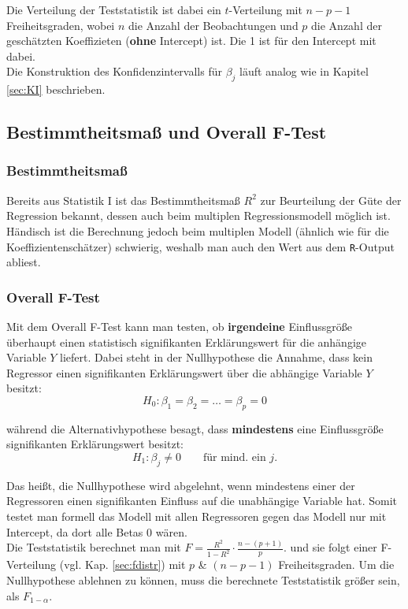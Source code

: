 \documentclass[a4paper]{article}
\begin{document}
\noindent Die Verteilung der Teststatistik ist dabei ein $t$-Verteilung mit $n-p-1$ Freiheitsgraden, wobei $n$ die Anzahl der Beobachtungen und $p$ die Anzahl der geschätzten Koeffizieten (\textbf{ohne} Intercept) ist. Die 1 ist für den Intercept mit dabei.\\

\noindent Die Konstruktion des Konfidenzintervalls für $\beta_j$ läuft analog wie in Kapitel \ref{sec:KI} beschrieben.

\subsection{Bestimmtheitsmaß und Overall F-Test}
\subsubsection{Bestimmtheitsmaß}
Bereits aus Statistik I ist das Bestimmtheitsmaß $R^2$ zur Beurteilung der Güte der Regression bekannt, dessen auch beim multiplen Regressionsmodell möglich ist. Händisch ist die Berechnung jedoch beim multiplen Modell (ähnlich wie für die Koeffizientenschätzer) schwierig, weshalb man auch den Wert aus dem \texttt{R}-Output abliest.

\subsubsection{Overall F-Test}
Mit dem Overall F-Test kann man testen, ob \textbf{irgendeine} Einflussgröße überhaupt einen statistisch signifikanten Erklärungswert für die anhängige Variable $Y$ liefert. Dabei steht in der Nullhypothese die Annahme, dass kein Regressor einen signifikanten Erklärungswert über die abhängige Variable $Y$ besitzt: 
$$H_0:\beta_1 = \beta_2 = \hdots = \beta_p = 0$$

\noindent während die Alternativhypothese besagt, dass \textbf{mindestens} eine Einflussgröße  signifikanten Erklärungswert besitzt: 
$$H_1: \beta_j \neq 0 \qquad \mbox{für mind. ein $j$.}$$ 

\noindent Das heißt, die Nullhypothese wird abgelehnt, wenn mindestens einer der Regressoren einen signifikanten Einfluss auf die unabhängige Variable hat. Somit testet man formell das Modell mit allen Regressoren gegen das Modell nur mit Intercept, da dort alle Betas 0 wären.\\
Die Teststatistik berechnet man mit $F=\frac{R^2}{1-R^2}\cdot \frac{n-(p+1)}{p}$. und sie folgt einer F-Verteilung (vgl. Kap. \ref{sec:fdistr}) mit $p$ \& $(n-p-1)$ Freiheitsgraden. Um die Nullhypothese ablehnen zu können, muss die berechnete Teststatistik größer sein, als $F_{1-\alpha}$. \\
\end{document}
